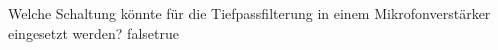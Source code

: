     {Welche Schaltung könnte für die Tiefpassfilterung in einem Mikrofonverstärker eingesetzt werden?}
    {}
    {}
    {}
    {}
    {false}{true}